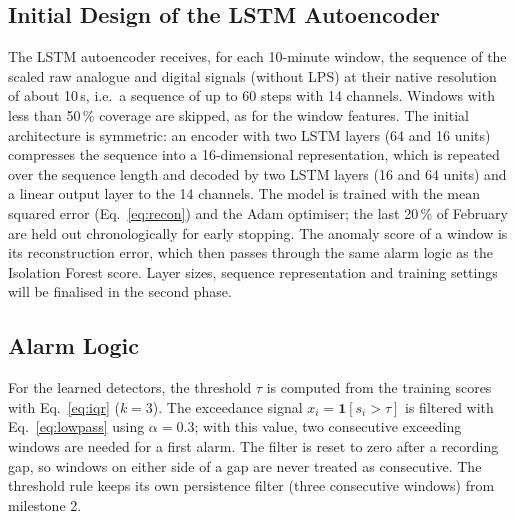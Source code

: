 \subsection{Initial Design of the LSTM Autoencoder}
\label{sec:lstm}
The LSTM autoencoder receives, for each 10-minute window, the sequence of the scaled raw analogue and digital signals (without LPS) at their native resolution of about 10\,s, i.e.\ a sequence of up to 60 steps with 14 channels. Windows with less than 50\,\% coverage are skipped, as for the window features. The initial architecture is symmetric: an encoder with two LSTM layers (64 and 16 units) compresses the sequence into a 16-dimensional representation, which is repeated over the sequence length and decoded by two LSTM layers (16 and 64 units) and a linear output layer to the 14 channels. The model is trained with the mean squared error (Eq.~\ref{eq:recon}) and the Adam optimiser; the last 20\,\% of February are held out chronologically for early stopping. The anomaly score of a window is its reconstruction error, which then passes through the same alarm logic as the Isolation Forest score. Layer sizes, sequence representation and training settings will be finalised in the second phase.

\subsection{Alarm Logic}
For the learned detectors, the threshold $\tau$ is computed from the training scores with Eq.~\ref{eq:iqr} ($k=3$). The exceedance signal $x_i=\mathbf{1}[s_i>\tau]$ is filtered with Eq.~\ref{eq:lowpass} using $\alpha=0.3$; with this value, two consecutive exceeding windows are needed for a first alarm. The filter is reset to zero after a recording gap, so windows on either side of a gap are never treated as consecutive. The threshold rule keeps its own persistence filter (three consecutive windows) from milestone 2.

